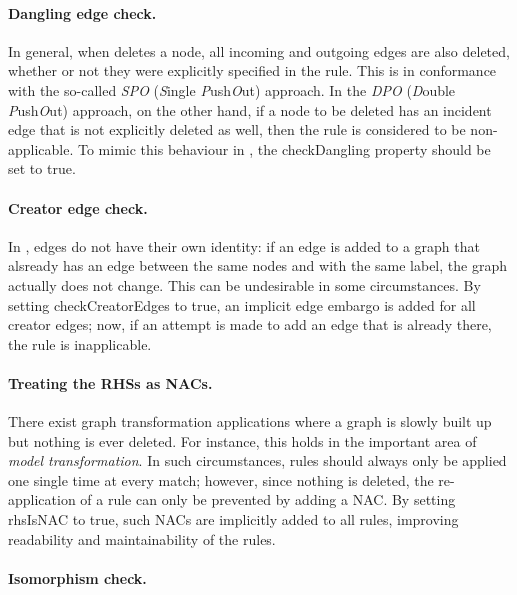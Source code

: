 \paragraph{Dangling edge check.}

In general, when \Groove{} deletes a node, all incoming and outgoing edges are
also deleted, whether or not they were explicitly specified in the rule. This
is in conformance with the so-called \emph{SPO} (\emph{S}ingle
\emph{P}ush\emph{O}ut) approach. In the \emph{DPO} (\emph{D}ouble
\emph{P}ush\emph{O}ut) approach, on the other hand, if a node to be deleted has
an incident edge that is not explicitly deleted as well, then the rule is
considered to be non-applicable. To mimic this behaviour in \Groove, the
\textsf{checkDangling} property should be set to \textsf{true}.

\paragraph{Creator edge check.}

In \Groove, edges do not have their own identity: if an edge is added to a
graph that alsready has an edge between the same nodes and with the same label,
the graph actually does not change. This can be undesirable in some
circumstances. By setting \textsf{checkCreatorEdges} to \textsf{true}, an
implicit edge embargo is added for all creator edges; now, if an attempt is
made to add an edge that is already there, the rule is inapplicable.

\paragraph{Treating the RHSs as NACs.}

There exist graph transformation applications where a graph is slowly built up
but 
nothing is ever deleted. For instance, this holds in the important area of
\emph{model transformation}. In such circumstances, rules should always only
be applied one single time at every match; however, since nothing is deleted,
the re-application of a rule can only be prevented by adding a NAC. By setting
\textsf{rhsIsNAC} to \textsf{true}, such NACs are implicitly added to all
rules, improving readability and maintainability of the rules.

\paragraph{Isomorphism check.}

